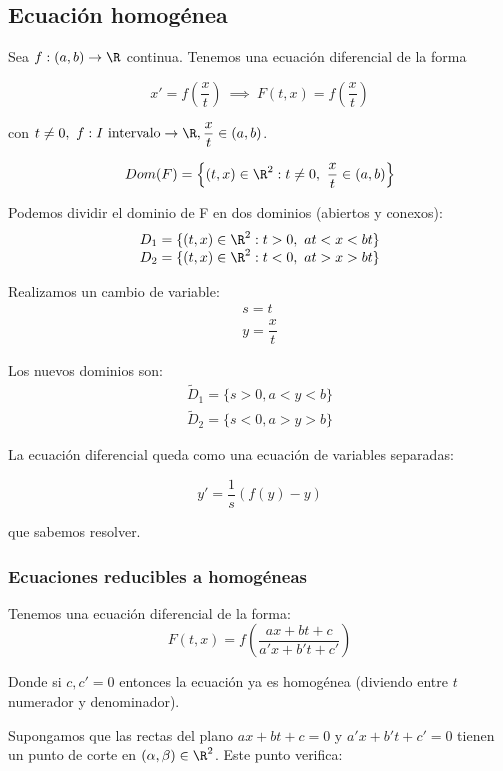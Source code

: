 \subsection{Ecuación homogénea}

Sea $f:(a,b) \to \R$ continua. Tenemos una ecuación diferencial de la forma

\[x' = f\left(\frac{x}{t}\right) \ \implies \ F\left(t,x\right) = f\left(\frac{x}{t}\right)\]

con $t \neq 0,\ f: I \text{ intervalo} \to \R, \dfrac{x}{t} \in (a,b)$.

\[Dom(F) = \left\{(t,x)\in \R ^2 : t \neq 0, \ \frac{x}{t} \in (a,b)\right\}\]

Podemos dividir el dominio de F en dos dominios (abiertos y conexos):\\
\[
\begin{array}{l}
  D_1 = \{(t,x) \in \R ^2 : t > 0, \ at < x < bt\}\\
  D_2 = \{(t,x) \in \R ^2 : t < 0, \ at > x > bt\}
\end{array}
\]

Realizamos un cambio de variable:
\[
\begin{array}{l}
  s = t\\
  y = \dfrac{x}{t}
\end{array}
\]

Los nuevos dominios son:
\[
\begin{array}{l}
  \tilde{D}_1 = \{s > 0, a < y < b\}\\
  \tilde{D}_2 = \{s < 0, a > y > b\}
\end{array}
\]

La ecuación diferencial queda como una ecuación de variables separadas:

$$y' = \frac{1}{s}\left(f(y) - y\right)$$

que sabemos resolver.

\subsubsection{Ecuaciones reducibles a homogéneas}

Tenemos una ecuación diferencial de la forma: 
\[
F(t,x) = f\left( \frac{ax+bt+c}{a'x+b't+c'} \right)
\]

Donde si $c,c' = 0$ entonces la ecuación ya es homogénea (diviendo entre $t$ numerador y denominador).

Supongamos que las rectas del plano $ax + bt+c=0$ y $a'x+b't+c'=0$ tienen un punto de corte en $(\alpha, \beta ) \in \R^2$. Este punto verifica:

